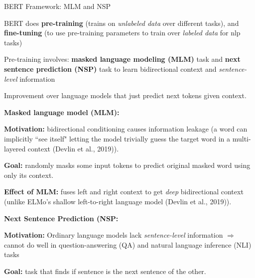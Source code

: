 \begin{frame}{BERT Framework: MLM and NSP}

\linespread{0.3} 

BERT does \textbf{pre-training} (trains on \emph{unlabeled data} over different tasks), and \textbf{fine-tuning} (to use pre-training parameters to train over \emph{labeled data} for nlp tasks)

Pre-training involves:  \textbf{masked language modeling (MLM)} task and \textbf{next sentence prediction (NSP)} task to learn bidirectional context and \emph{sentence-level} information

Improvement over language models that just predict next tokens given context. 



{\large \textbf{Masked language model (MLM): }}
    \begin{itemizeSpaced}{2pt}
        \pinkbox \textbf{Motivation: } bidirectional conditioning causes information leakage (a word can implicitly ``see itself" letting the model trivially guess the target word in a multi-layered context (Devlin et al., 2019)). 
        
        \item \textbf{Goal: }randomly masks some input tokens to predict original masked word using only its context. 
        
        \item \textbf{Effect of MLM: } fuses left and right context to get \emph{deep} bidirectional context (unlike ELMo's shallow left-to-right language model (Devlin et al., 2019)).  
    \end{itemizeSpaced}
    
{\large \textbf{Next Sentence Prediction (NSP: }}
    \begin{itemizeSpaced}{2pt}
        \pinkbox \textbf{Motivation: }Ordinary  language models lack \emph{sentence-level} information $\Rightarrow$ cannot do well in question-answering (QA) and natural language inference (NLI) tasks
        
        
        \item \textbf{Goal: } task that finds if sentence is the next sentence of the other. 
        
    \end{itemizeSpaced}
    
\end{frame}


